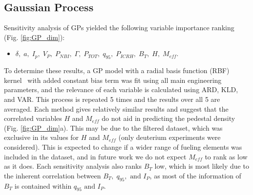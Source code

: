 \documentclass[a4paper, twoside, final, 12pt]{article}
\begin{document}
{\subsection{Gaussian Process}

Sensitivity analysis of GPs yielded the following variable importance ranking (Fig. \ref{fig:GP_dim}): 
\begin{itemize}
	\item  $\delta, \; a,\; I_p,\; V_P, \; P_{NBI}, \; \Gamma, \;  P_{TOT},\;  q_{95},\;  P_{ICRH},\; B_T,\; H,\; M_{eff}$. 
\end{itemize}
To determine these results, a GP model with a radial basis function (RBF) kernel~\cite{kernel_cookbook} with added constant bias term was fit using all main engineering parameters, and the relevance of each variable is calculated using ARD, KLD, and VAR. This process is repeated 5 times and the results over all 5 are averaged. Each method gives relatively similar results and suggest that the correlated variables $H$ and $M_{eff}$ do not aid in predicting the pedestal density (Fig. \ref{fig:GP_dim}a). This may be due to the filtered dataset, which was exclusive in its values for $H$ and $M_{eff}$ (only deuterium experiments were considered). This is expected to change if a wider range of fueling elements was included in the dataset, and in future work we do not expect $M_{eff}$ to rank as low as it does. Each sensitivity analysis also ranks $B_T$ low, which is most likely due to the inherent correlation between $B_T, \; q_{95}, \text{ and } I_P$, as most of the information of $B_T$ is contained within $q_{95} \text{ and } I_P$. 

}
\end{document}
